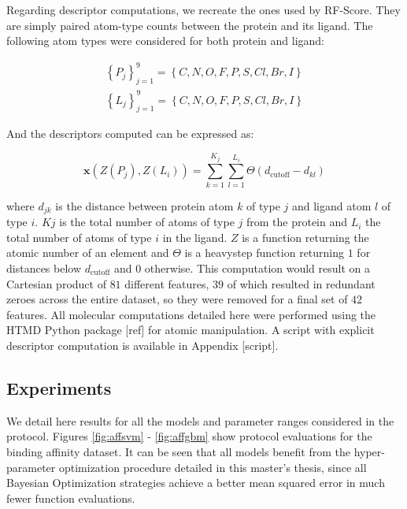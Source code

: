 \documentclass[10pt,a4paper,twoside]{book}
\begin{document}
Regarding descriptor computations, we recreate the ones used by RF-Score. They are simply paired atom-type counts between the protein and its ligand. The following atom types were considered for both protein and ligand:

\begin{align*}
\left\lbrace P_j \right\rbrace_{j=1}^9 = \left\lbrace C, N, O, F, P, S, Cl, Br, I \right\rbrace \\
\left\lbrace L_j \right\rbrace_{j=1}^9 = \left\lbrace C, N, O, F, P, S, Cl, Br, I \right\rbrace
\end{align*}

And the descriptors computed can be expressed as:

\begin{equation}
\boldsymbol{x}\left(Z(P_j), Z(L_i)\right) = \sum_{k=1}^{K_j}\sum_{l=1}^{L_i}\Theta (d_{\mathrm{cutoff}} - d_{kl})
\end{equation}

where $d_{jk}$ is the distance between protein atom $k$ of type $j$ and ligand atom $l$ of type $i$. $Kj$ is the total number of atoms of type $j$ from the protein and $L_i$ the total number of atoms of type $i$ in the ligand. $Z$ is a function returning the atomic number of an element and $\Theta$ is a heavystep function returning $1$ for distances below $d_{\mathrm{cutoff}}$ and $0$ otherwise. This computation would result on a Cartesian product of $81$ different features, $39$ of which resulted in redundant zeroes across the entire dataset, so they were removed for a final set of $42$ features. All molecular computations detailed here were performed using the HTMD Python package [ref] for atomic manipulation. A script with explicit descriptor computation is available in Appendix [script].

\subsection{Experiments}

We detail here results for all the models and parameter ranges considered in the protocol. Figures \ref{fig:affsvm} - \ref{fig:affgbm} show protocol evaluations for the binding affinity dataset. It can be seen that all models benefit from the hyper-parameter optimization procedure detailed in this master's thesis, since all Bayesian Optimization strategies achieve a better mean squared error in much fewer function evaluations.
\end{document}
